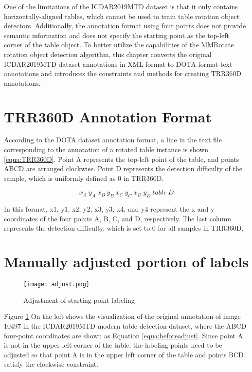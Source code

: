 \documentclass{article}
\begin{document}
One of the limitations of the ICDAR2019MTD dataset is that it only contains horizontally-aligned tables, which cannot be used to train table rotation object detectors. Additionally, the annotation format using four points does not provide semantic information and does not specify the starting point as the top-left corner of the table object. To better utilize the capabilities of the MMRotate\cite{Zhou2022} rotation object detection algorithm, this chapter converts the original ICDAR2019MTD dataset annotations in XML format to DOTA-format text annotations and introduces the constraints and methods for creating TRR360D annotations.

\section{TRR360D Annotation Format}



According to the DOTA\cite{Xia2018} dataset annotation format, a line in the text file corresponding to the annotation of a rotated table instance is shown \ref{equa:TRR360D}. Point A represents the top-left point of the table, and points ABCD are arranged clockwise. Point D represents the detection difficulty of the sample, which is uniformly defined as 0 in TRR360D.

\begin{equation}
	x_{A} \ y_{A} \ x_{B} \ y_{B} \ x_{C} \ y_{C} \ x_{D} \ y_{D} \ table \ D 
 \label{equa:TRR360D}
\end{equation}

In this format, x1, y1, x2, y2, x3, y3, x4, and y4 represent the x and y coordinates of the four points A, B, C, and D, respectively. The last column represents the detection difficulty, which is set to 0 for all samples in TRR360D.


\section{Manually adjusted portion of labels}



\begin{figure}[ht]
    \centering
    \texttt{[image: adjust.png]}
    \caption{Adjustment of starting point labeling}
    \label{fig:AdjustPoint}
\end{figure}

Figure \ref{fig:AdjustPoint} On the left shows the visualization of the original annotation of image 10497 in the ICDAR2019MTD modern table detection dataset, where the ABCD four-point coordinates are shown as Equation \ref{equa:beforeadjust}. Since point A is not in the upper left corner of the table, the labeling points need to be adjusted so that point A is in the upper left corner of the table and points BCD satisfy the clockwise constraint.
\end{document}
